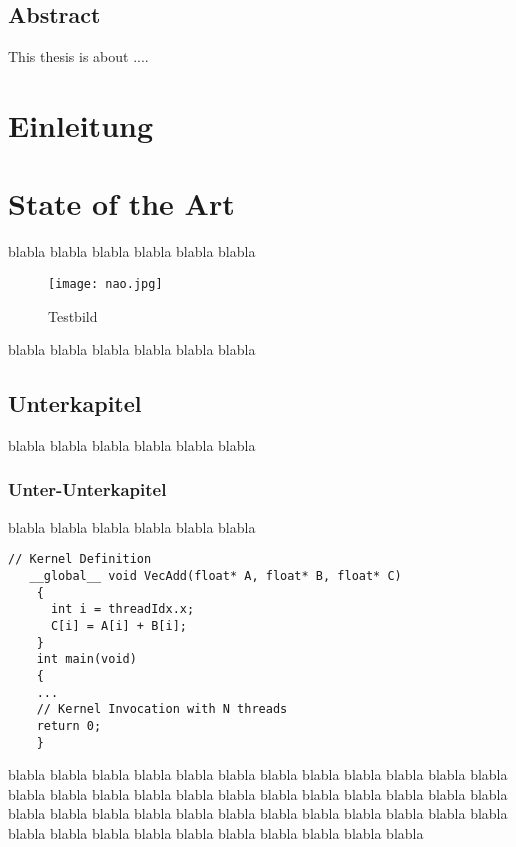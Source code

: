 \documentclass[12pt,a4paper,DIV13,pdftex,BCOR10mm,fleqn,liststotoc,bibtotoc,cleardoubleempty]{scrbook}
\begin{document}
\vspace{5cm}
\section*{Abstract}
This thesis is about ....

\nonfrenchspacing
\renewcommand{\figurename}{Abb.}
\renewcommand{\tablename}{Tab.}


\tableofcontents %
\listoffigures %
\listoftables
\mainmatter
%
\chapter{Einleitung}

\chapter{State of the Art}
blabla blabla blabla blabla blabla blabla 
\begin{figure}[htb]
\centering
\texttt{[image: nao.jpg]} %
\caption{Testbild}
\label{Testbild}
\end{figure}
blabla blabla blabla blabla blabla blabla 
\section{Unterkapitel}
blabla blabla blabla blabla blabla blabla 
\subsection{Unter-Unterkapitel}
blabla blabla blabla blabla blabla blabla 
\begin{lstlisting}[caption={Beispiel f\"{u}r eine Activity}, label={list:activity}]
    // Kernel Definition
   __global__ void VecAdd(float* A, float* B, float* C)
    {
      int i = threadIdx.x;
      C[i] = A[i] + B[i];
    }
    int main(void)
    {
    ...
    // Kernel Invocation with N threads
    return 0;
    }
    \end{lstlisting}
blabla blabla blabla blabla blabla blabla blabla blabla blabla blabla blabla blabla blabla blabla blabla blabla blabla blabla blabla blabla blabla blabla blabla blabla blabla blabla blabla blabla blabla blabla blabla blabla blabla blabla blabla blabla blabla blabla blabla blabla blabla blabla blabla blabla blabla blabla
\end{document}
